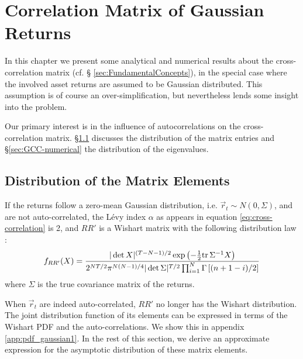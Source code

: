 \chapter{Correlation Matrix of Gaussian Returns}\label{chp:Gaussian}
In this chapter we present some analytical and numerical results about
the cross-correlation matrix (cf. \S
\ref{sec:FundamentalConcepts}), in the special case where the involved
asset returns are assumed to be Gaussian distributed. This assumption
is of course an over-simplification, but nevertheless lends some
insight into the problem.

Our primary interest is in the influence of autocorrelations on the
cross-correlation matrix. \S \ref{sec:GCC-analytical} discusses the
distribution of the matrix entries and \S \ref{sec:GCC-numerical} the
distribution of the eigenvalues.

\section{Distribution of the Matrix Elements}\label{sec:GCC-analytical}
If the returns follow a zero-mean Gaussian distribution, 
i.e. $\vec{r}_t \sim N(0, \Sigma)$, and are not
auto-correlated, the L\'evy index $\alpha$ as appears in equation
\ref{eq:cross-correlation} is 2, and $RR'$ is a Wishart matrix with
the following distribution law \cite{Anderson2003}:
\begin{equation}
  \label{eq:WishartPDF}
  f_{RR'}(X) = { |\det X|^{(T-N-1)/2} \exp\left(-{1 \over 2}\text{tr}\,
      \Sigma^{-1}X \right)
    \over
    2^{NT/2}\pi^{N(N-1)/4}|\det \Sigma|^{T/2}
    \prod_{i=1}^N \Gamma\left[(n+1-i)/2\right]
  }
\end{equation}
where $\Sigma$ is the true covariance matrix of the returns.

When $\vec{r}_t$ are indeed auto-correlated, $RR'$ no longer has the
Wishart distribution. The joint distribution function of its elements
can be expressed in terms of the Wishart PDF and the
auto-correlations. We show this in appendix
\ref{app:pdf_gaussian1}. In the rest of this section, we derive an
approximate expression for the asymptotic distribution of these matrix
elements.

